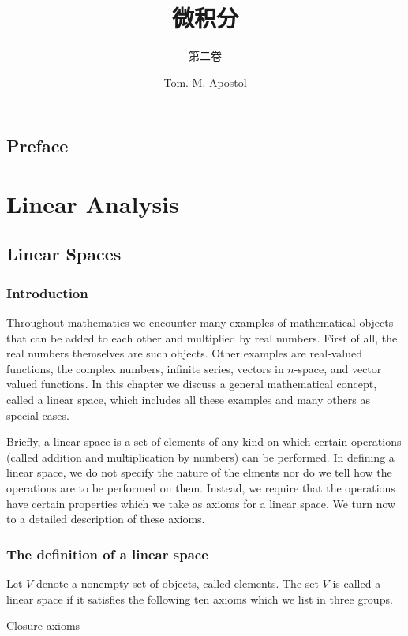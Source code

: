\documentclass[cn,11pt,chinese]{elegantbook}
\title{微积分}
\subtitle{第二卷}
\author{Tom. M. Apostol}
\numberwithin{equation}{section}
\begin{document}
\maketitle

\chapter*{Preface}


\tableofcontents
\mainmatter
\hypersetup{pageanchor=true}


\part{Linear Analysis}
\chapter{Linear Spaces}
\section{Introduction}
Throughout mathematics we encounter many examples of mathematical objects that can be added to each other and multiplied by real numbers. First of all, the real numbers themselves are such objects. Other examples are real-valued functions, the complex numbers, infinite series, vectors in $n$-space, and vector valued functions. In this chapter we discuss a general mathematical concept, called a linear space, which includes all these examples and many others as special cases.

Briefly, a linear space is a set of elements of any kind on which certain operations (called addition and multiplication by numbers) can be performed. In defining a linear space, we do not specify the nature of the elments nor do we tell how the operations are to be performed on them. Instead, we require that the operations have certain properties which we take as axioms for a linear space. We turn now to a detailed description of these axioms.


\section{The definition of a linear space}
Let $V$ denote a nonempty set of objects, called elements. The set $V$ is called a linear space if it satisfies the following ten axioms which we list in three groups.

Closure axioms
\end{document}
